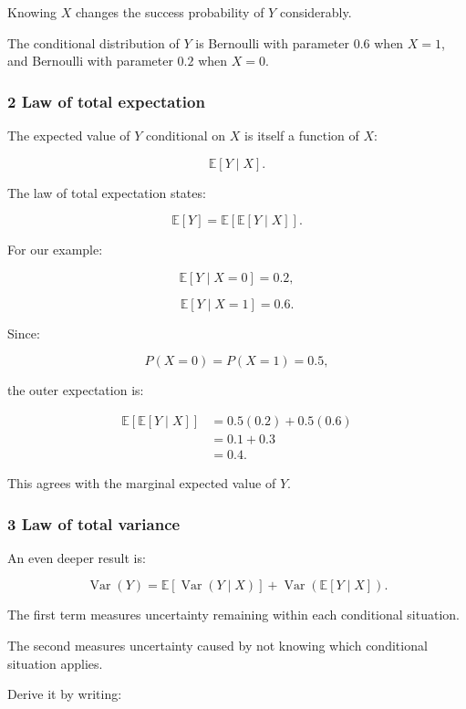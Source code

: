 Knowing \(X\) changes the success probability of \(Y\) considerably.

The conditional distribution of \(Y\) is Bernoulli with parameter \(0.6\) when \(X=1\), and Bernoulli with parameter \(0.2\) when \(X=0\).

\subsubsection{2 Law of total expectation}\label{02-foundations-ii-ch023-law-of-total-expectation}

The expected value of \(Y\) conditional on \(X\) is itself a function of \(X\):

\[
 \mathbb E[Y\mid X].
\]

The law of total expectation states:

\[
 \boxed{ \mathbb E[Y]= \mathbb E[\mathbb E[Y\mid X]] }.
\]

For our example:

\[
 \mathbb E[Y\mid X=0]=0.2,
\]

\[
 \mathbb E[Y\mid X=1]=0.6.
\]

Since:

\[
 P(X=0)=P(X=1)=0.5,
\]

the outer expectation is:

\[
 \begin{aligned} \mathbb E[\mathbb E[Y\mid X]] &=0.5(0.2)+0.5(0.6)\\ &=0.1+0.3\\ &=\boxed{0.4}. \end{aligned}
\]

This agrees with the marginal expected value of \(Y\).

\subsubsection{3 Law of total variance}\label{02-foundations-ii-ch023-law-of-total-variance}

An even deeper result is:

\[
 \boxed{ \operatorname{Var}(Y) = \mathbb E[\operatorname{Var}(Y\mid X)] + \operatorname{Var}(\mathbb E[Y\mid X]) }.
\]

The first term measures uncertainty remaining within each conditional situation.

The second measures uncertainty caused by not knowing which conditional situation applies.

Derive it by writing:

